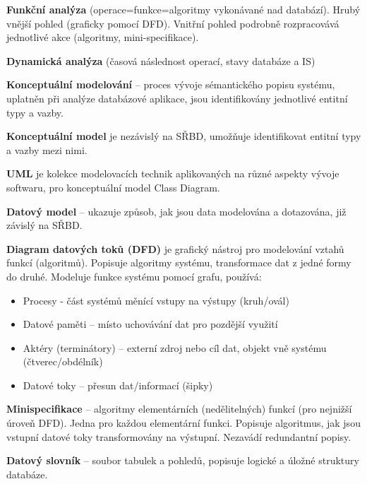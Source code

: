 \textbf{Funkční analýza} (operace=funkce=algoritmy vykonávané nad databází). Hrubý vnější pohled (graficky pomocí DFD). Vnitřní pohled podrobně rozpracovává jednotlivé akce (algoritmy, mini-specifikace).

\textbf{Dynamická analýza} (časová následnost operací, stavy databáze a IS)

\textbf{Konceptuální modelování} – proces vývoje sémantického popisu systému, uplatněn při analýze databázové aplikace, jsou identifikovány jednotlivé entitní typy a vazby.

\textbf{Konceptuální model} je nezávislý na SŘBD, umožňuje identifikovat entitní typy a vazby mezi nimi.

\textbf{UML} je kolekce modelovacích technik aplikovaných na různé aspekty vývoje softwaru, pro konceptuální model Class Diagram.

\textbf{Datový model} – ukazuje způsob, jak jsou data modelována a dotazována, již závislý na SŘBD.


\textbf{Diagram datových toků (DFD)} je grafický nástroj pro modelování vztahů funkcí (algoritmů). Popisuje algoritmy systému, transformace dat z jedné formy do druhé. Modeluje funkce systému pomocí grafu, používá:
\begin{itemize}
\item Procesy  - část systémů měnící vstupy na výstupy (kruh/ovál)
\item Datové paměti – místo uchovávání dat pro pozdější využití
\item Aktéry (terminátory) – externí zdroj nebo cíl dat, objekt vně systému (čtverec/obdélník)
\item Datové toky – přesun dat/informací (šipky)
\end{itemize}


\textbf{Minispecifikace} -- algoritmy elementárních (nedělitelných) funkcí (pro nejnižší úroveň DFD). Jedna pro každou elementární funkci. Popisuje algoritmus, jak jsou vstupní datové toky transformovány na výstupní. Nezavádí redundantní popisy.

\textbf{Datový slovník} – soubor tabulek a pohledů, popisuje logické a úložné struktury databáze.
